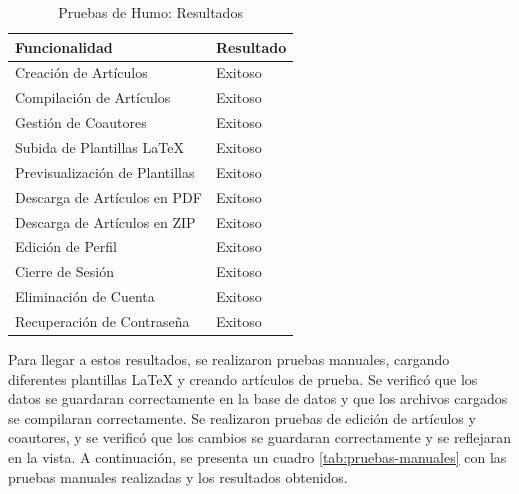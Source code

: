 \begin{table}[H]
    \centering
    \begin{tabular}{|p{10cm}|p{4cm}|}
        \hline
        \textbf{Funcionalidad} & \textbf{Resultado} \\
        \hline
        Creación de Artículos & Exitoso \\
        Compilación de Artículos & Exitoso \\
        Gestión de Coautores & Exitoso \\
        Subida de Plantillas LaTeX & Exitoso \\
        Previsualización de Plantillas & Exitoso \\
        Descarga de Artículos en PDF & Exitoso \\
        Descarga de Artículos en ZIP & Exitoso \\
        Edición de Perfil & Exitoso \\
        Cierre de Sesión & Exitoso \\
        Eliminación de Cuenta & Exitoso \\
        Recuperación de Contraseña & Exitoso \\
        \hline
    \end{tabular}
    \caption{Pruebas de Humo: Resultados}
    \label{tab:pruebas-humo}
\end{table}

Para llegar a estos resultados, se realizaron pruebas manuales, cargando diferentes plantillas LaTeX y creando artículos de prueba. Se verificó que los datos se guardaran correctamente en la base de datos y que los archivos cargados se compilaran correctamente. Se realizaron pruebas de edición de artículos y coautores, y se verificó que los cambios se guardaran correctamente y se reflejaran en la vista. A continuación, se presenta un cuadro \ref{tab:pruebas-manuales} con las pruebas manuales realizadas y los resultados obtenidos.

